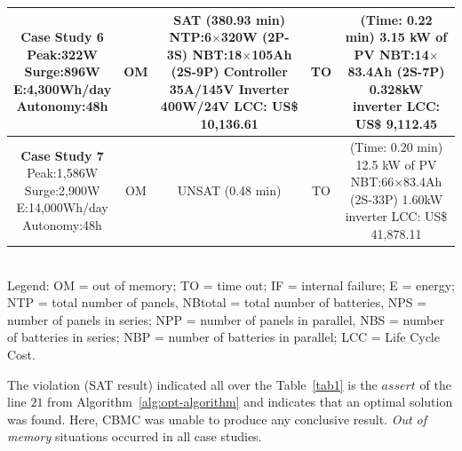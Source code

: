\documentclass[runningheads]{llncs}
\begin{document}
\begin{table}
\begin{scriptsize}
\begin{tabular}{c|c|c|c|c}
\hline
\makecell{\textbf{Case Study 6}\\Peak:322W\\Surge:896W\\E:4,300Wh/day\\Autonomy:48h} & OM & \makecell {SAT (380.93 min) \\NTP:6$\times$320W (2P-3S)\\NBT:18$\times$105Ah (2S-9P)\\Controller 35A/145V\\Inverter 400W/24V \\LCC: US\$ 10,136.61} & TO & \makecell{(Time: 0.22 min)\\3.15 kW of PV\\NBT:14$\times$83.4Ah (2S-7P)\\0.328kW inverter\\LCC: US\$ 9,112.45} \\
\hline
\makecell{\textbf{Case Study 7}\\Peak:1,586W\\Surge:2,900W\\E:14,000Wh/day\\Autonomy:48h} & OM & UNSAT (0.48 min) & TO & \makecell{(Time: 0.20 min)\\12.5 kW of PV\\NBT:66$\times$83.4Ah (2S-33P)\\1.60kW inverter\\LCC: US\$ 41,878.11} \\
\hline
\hline
\end{tabular}
\\Legend: OM = out of memory; TO = time out; IF = internal failure; E = energy;        NTP = total number of panels, NBtotal = total number of batteries, NPS = number of panels in series; NPP = number of panels in parallel, NBS = number of batteries in series; NBP = number of batteries in parallel; LCC = Life Cycle Cost.
\end{scriptsize}
\end{table}
%
The violation (SAT result) indicated all over the Table~\ref{tab1} 
is the $assert$ of the line $21$ from Algorithm~\ref{alg:opt-algorithm} and indicates that an optimal solution was found.
Here, CBMC was unable to produce any conclusive result. \textit{Out of memory} situations occurred in all case studies.
\end{document}
